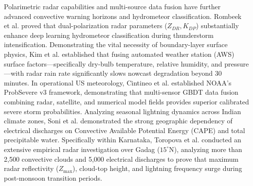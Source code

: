 \documentclass[12pt,a4paper]{report}
\begin{document}
Polarimetric radar capabilities and multi-source data fusion have further advanced convective warning horizons and hydrometeor classification. Rombeek et al. \cite{rombeek2024exploiting} proved that dual-polarization radar parameters ($Z_{DR}, K_{DP}$) substantially enhance deep learning hydrometeor classification during thunderstorm intensification. Demonstrating the vital necessity of boundary-layer surface physics, Kim et al. \cite{kim2024improvements} established that fusing automated weather station (AWS) surface factors---specifically dry-bulb temperature, relative humidity, and pressure---with radar rain rate significantly slows nowcast degradation beyond 30 minutes. In operational US meteorology, Cintineo et al. \cite{cintineo2024probsevere} established NOAA's ProbSevere v3 framework, demonstrating that multi-sensor GBDT data fusion combining radar, satellite, and numerical model fields provides superior calibrated severe storm probabilities. Analyzing seasonal lightning dynamics across Indian climate zones, Soni et al. \cite{soni2023machine} demonstrated the strong geographic dependency of electrical discharges on Convective Available Potential Energy (CAPE) and total precipitable water. Specifically within Karnataka, Toropova et al. \cite{toropova2022characteristics} conducted an extensive empirical radar investigation over Gadag ($15^\circ\text{N}$), analyzing more than 2,500 convective clouds and 5,000 electrical discharges to prove that maximum radar reflectivity ($Z_{\max}$), cloud-top height, and lightning frequency surge during post-monsoon transition periods.
\end{document}
